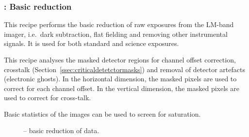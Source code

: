 \clearpage
\subsubsection{:  Basic reduction}
\label{lm_img_basic}
\label{rec:lm_img_basic}
\label{sssec:lm_img_basic}
\label{metis_lm_img_basic_reduce}
\label{rec:metis_lm_img_basic_reduce}
\label{sssec:metis_lm_img_basic_reduce}


This recipe performs the basic reduction of raw exposures from the
LM-band imager, i.e.\ dark subtraction, flat fielding and removing
other instrumental signals. It is used for both standard and science exposures.

This recipe analyses the masked detector regions for channel offset correction, crosstalk (Section~\ref{ssec:criticaldetetctormasks}) and removal of detector artefacts (electronic ghosts).
In the horizontal dimension, the masked pixels are used to correct for each channel offset.
In the vertical dimension, the masked pixels are used to correct for cross-talk.

Basic statistics of the images can be used to screen for saturation.



\begin{figure}[hb]
  \centering
    \def \globalscale {0.700000}
    \fontsize{10}{12}\selectfont
    
  \caption[Recipe: ]{ --
    basic reduction of  data.}
  \label{fig:metis_lm_img_basic_reduce}
\end{figure}
\restoregeometry

